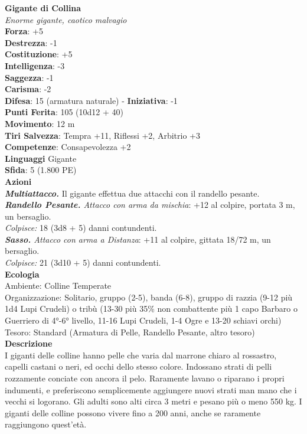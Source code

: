 \begin{multicols}{2}
\medskip\textbf{Gigante di Collina}\\
\emph{Enorme gigante, caotico malvagio}\\
\textbf{Forza}: +5\\
\textbf{Destrezza}: -1\\
\textbf{Costituzione}: +5\\
\textbf{Intelligenza}: -3\\
\textbf{Saggezza}: -1\\
\textbf{Carisma}: -2\\
\textbf{Difesa}: 15 (armatura naturale) - \textbf{Iniziativa}: -1\\
\textbf{Punti Ferita}: 105 (10d12 + 40)\\
\textbf{Movimento}: 12 m\\
\textbf{Tiri Salvezza}: Tempra +11, Riflessi +2, Arbitrio +3\\
\textbf{Competenze}: Consapevolezza +2\\
\textbf{Linguaggi} Gigante\\
\textbf{Sfida}: 5 (1.800 PE)\smallskip\\
\smallskip\textbf{Azioni}\\
\emph{\textbf{Multiattacco.}} Il gigante effettua due attacchi con il randello pesante.\\
\emph{\textbf{Randello Pesante.} Attacco con arma da mischia}: +12 al colpire, portata 3 m, un bersaglio.\\
\emph{Colpisce:} 18 (3d8 + 5) danni contundenti.\\
\emph{\textbf{Sasso.} Attacco con arma a Distanza}: +11 al colpire, gittata 18/72 m, un bersaglio.\\
\emph{Colpisce:} 21 (3d10 + 5) danni contundenti.\\
\textbf{Ecologia}\\
Ambiente: Colline Temperate\\
Organizzazione: Solitario, gruppo (2-5), banda (6-8), gruppo di razzia (9-12 più 1d4 Lupi Crudeli) o tribù (13-30 più 35\% non combattente più 1 capo Barbaro o Guerriero di 4°-6° livello, 11-16 Lupi Crudeli, 1-4 Ogre e 13-20 schiavi orchi)\\
Tesoro: Standard (Armatura di Pelle, Randello Pesante, altro tesoro)\\
\textbf{Descrizione}\\
I giganti delle colline hanno pelle che varia dal marrone chiaro al rossastro, capelli castani o neri, ed occhi dello stesso colore. Indossano strati di pelli rozzamente conciate con ancora il pelo. Raramente lavano o riparano i propri indumenti, e preferiscono semplicemente aggiungere nuovi strati man mano che i vecchi si logorano. Gli adulti sono alti circa 3 metri e pesano più o meno 550 kg. I giganti delle colline possono vivere fino a 200 anni, anche se raramente raggiungono quest’età.\\

\end{multicols}
